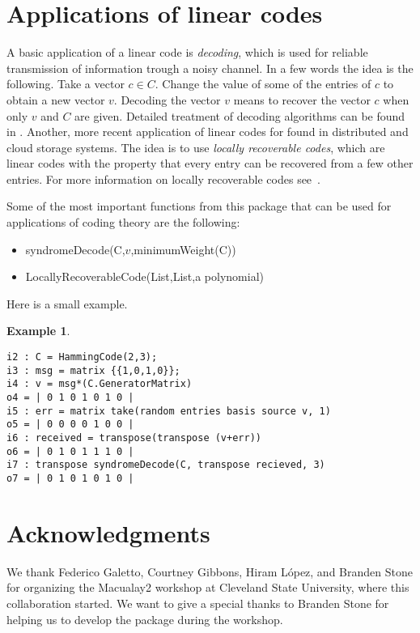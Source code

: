 \documentclass[12pt]{amsart}
\theoremstyle{plain}
\newtheorem{example}[theorem]{Example}
\begin{document}
\section{Applications of linear codes}
A basic application of a linear code is {\it decoding}, which is used for reliable transmission of information trough a noisy channel. In a few words the idea is the following. Take a vector $c\in C.$ Change the value of some of the entries of $c$ to obtain a new vector $v$. Decoding the vector $v$ means to recover the vector $c$ when only $v$ and $C$ are given. Detailed treatment of decoding algorithms can be found in \cite{huf-pless}. Another, more recent application of linear codes for found in distributed and cloud storage systems. The idea is to use {\it locally recoverable codes}, which are linear codes with the property that every entry can be recovered from a few other entries. For more information on locally recoverable codes see~\cite{TamoBarg}. 


Some of the most important functions from this package that can be used for applications of coding theory are the following:
\begin{itemize}
\item syndromeDecode(C,$v$,minimumWeight(C))
\item LocallyRecoverableCode(List,List,a polynomial)
\end{itemize}

Here is a small example.

\begin{example}
$\,$
\begin{verbatim}
i2 : C = HammingCode(2,3);
i3 : msg = matrix {{1,0,1,0}};
i4 : v = msg*(C.GeneratorMatrix)
o4 = | 0 1 0 1 0 1 0 |
i5 : err = matrix take(random entries basis source v, 1)
o5 = | 0 0 0 0 1 0 0 |
i6 : received = transpose(transpose (v+err))
o6 = | 0 1 0 1 1 1 0 |
i7 : transpose syndromeDecode(C, transpose recieved, 3)
o7 = | 0 1 0 1 0 1 0 |
\end{verbatim}
\end{example}


\section*{Acknowledgments}
We thank Federico Galetto, Courtney Gibbons, Hiram L\'opez, and Branden Stone for organizing the Macualay2 workshop at Cleveland State University, where this collaboration started. We want to give a special thanks to Branden Stone for helping us to develop the package during the workshop.
\end{document}
